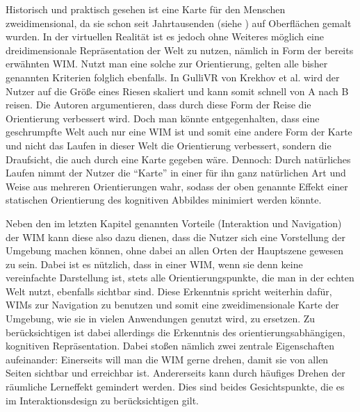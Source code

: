 Historisch und praktisch gesehen ist eine Karte für den Menschen zweidimensional, da sie schon seit Jahrtausenden (siehe \cite{meece_2006}) auf Oberflächen gemalt wurden. 
In der virtuellen Realität ist es jedoch ohne Weiteres möglich eine dreidimensionale Repräsentation der Welt zu nutzen, nämlich in Form der bereits erwähnten WIM.
Nutzt man eine solche zur Orientierung, gelten alle bisher genannten Kriterien folglich ebenfalls.
In GulliVR von Krekhov et al. \cite{Krekhov2018GulliVR} wird der Nutzer auf die Größe eines Riesen skaliert und kann somit schnell von A nach B reisen. Die Autoren argumentieren, dass durch diese Form der Reise die Orientierung verbessert wird. Doch man könnte entgegenhalten, dass eine geschrumpfte Welt auch nur eine WIM ist und somit eine andere Form der Karte und nicht das Laufen in dieser Welt die Orientierung verbessert, sondern die Draufsicht, die auch durch eine Karte gegeben wäre.
Dennoch: Durch natürliches Laufen nimmt der Nutzer die “Karte” in einer für ihn ganz natürlichen Art und Weise aus mehreren Orientierungen wahr, sodass der oben genannte Effekt einer statischen Orientierung des kognitiven Abbildes minimiert werden könnte.

Neben den im letzten Kapitel genannten Vorteile (Interaktion und Navigation) der WIM kann diese also dazu dienen, dass die Nutzer sich eine Vorstellung der Umgebung machen können, ohne dabei an allen Orten der Hauptszene gewesen zu sein. Dabei ist es nützlich, dass in einer WIM, wenn sie denn keine vereinfachte Darstellung ist, stets alle Orientierungspunkte, die man in der echten Welt nutzt, ebenfalls sichtbar sind.
Diese Erkenntnis spricht weiterhin dafür, WIMs zur Navigation zu benutzen und somit eine zweidimensionale Karte der Umgebung, wie sie in vielen Anwendungen genutzt wird, zu ersetzen.
Zu berücksichtigen ist dabei allerdings die Erkenntnis des orientierungsabhängigen, kognitiven Repräsentation. Dabei stoßen nämlich zwei zentrale Eigenschaften aufeinander: Einerseits will man die WIM gerne drehen, damit sie von allen Seiten sichtbar und erreichbar ist. Andererseits kann durch häufiges Drehen der räumliche Lerneffekt gemindert werden. Dies sind beides Gesichtspunkte, die es im Interaktionsdesign zu berücksichtigen gilt.